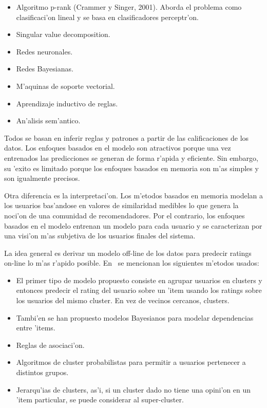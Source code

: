 \documentclass[11pt]{article}
\begin{document}
\begin{itemize}
\item Algoritmo p-rank (Crammer y Singer, 2001). Aborda el problema como clasificaci'on lineal y se basa en clasificadores perceptr'on.
\item Singular value decomposition.
\item Redes neuronales.
\item Redes Bayesianas.
\item M'aquinas de soporte vectorial.
\item Aprendizaje inductivo de reglas.
\item An'alisis sem'antico.
\end{itemize}

Todos se basan en inferir reglas y patrones a partir de las calificaciones de los datos. Los enfoques basados en el modelo son atractivos porque una vez entrenados las predicciones se generan de forma r'apida y eficiente. Sin embargo, su 'exito es limitado porque los enfoques basados en memoria son m'as simples y son igualmente precisos.

Otra diferencia es la interpretaci'on. Los m'etodos basados en memoria modelan a los usuarios bas'andose en valores de similaridad medibles lo que genera la noci'on de una comunidad de recomendadores. Por el contrario, los enfoques basados en el modelo entrenan un modelo para cada usuario y se caracterizan por una visi'on m'as subjetiva de los usuarios finales del sistema.

La idea general es derivar un modelo off-line de los datos para predecir ratings on-line lo m'as r'apido posible. En~\cite{start:candillier09} se mencionan los siguientes m'etodos usados:

\begin{itemize}
\item El primer tipo de modelo propuesto consiste en agrupar usuarios en clusters y entonces predecir el rating del usuario sobre un 'item usando los ratings sobre los usuarios del mismo cluster. En vez de vecinos cercanos, clusters.
\item Tambi'en se han propuesto modelos Bayesianos para modelar dependencias entre 'items.
\item Reglas de asociaci'on.
\item Algoritmos de cluster probabilistas para permitir a usuarios pertenecer a distintos grupos.
\item Jerarqu'ias de clusters, as'i, si un cluster dado no tiene una opini'on en un 'item particular, se puede considerar al super-cluster.
\end{itemize}
\end{document}
